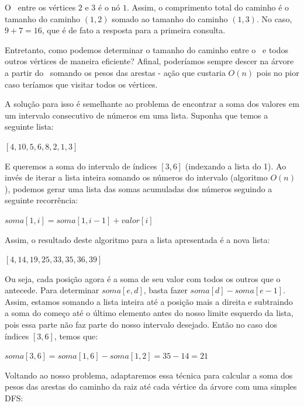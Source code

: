 O \LCA\ entre os vértices $2$ e $3$ é o nó $1$. Assim, o comprimento total do caminho é o tamanho do caminho $(1, 2)$ somado ao tamanho do caminho $(1, 3)$. No caso, $9 + 7 = 16$, que é de fato a resposta para a primeira consulta.

Entretanto, como podemos determinar o tamanho do caminho entre o \LCA\ e todos outros vértices de maneira eficiente? Afinal, poderíamos sempre descer na árvore a partir do \LCA\ somando os pesos das arestas - ação que custaria $O(n)$ pois no pior caso teríamos que visitar todos os vértices.

A solução para isso é semelhante ao problema de encontrar a soma dos valores em um intervalo consecutivo de números em uma lista. Suponha que temos a seguinte lista:

\begin{center}
    $[4, 10, 5, 6, 8, 2, 1, 3]$
\end{center}

E queremos a soma do intervalo de índices $[3, 6]$ (indexando a lista do 1). Ao invés de iterar a lista inteira somando os números do intervalo (algoritmo $O(n)$), podemos gerar uma lista das somas acumuladas dos números seguindo a seguinte recorrência:

\begin{center}
    $soma[1, i] = soma[1, i-1] + valor[i]$
\end{center}

Assim, o resultado deste algoritmo para a lista apresentada é a nova lista:

\begin{center}
    $[4, 14, 19, 25, 33, 35, 36, 39]$
\end{center}

Ou seja, cada posição agora é a soma de seu valor com todos os outros que o antecede. Para determinar $soma[e, d]$, basta fazer $soma[d] - soma[e-1]$. Assim, estamos somando a lista inteira até a posição mais a direita e subtraindo a soma do começo até o último elemento antes do nosso limite esquerdo da lista, pois essa parte não faz parte do nosso intervalo desejado. Então no caso dos índices $[3, 6]$, temos que:

\begin{center}
    $soma[3, 6] = soma[1, 6] - soma[1, 2] = 35 - 14 = 21$\\
\end{center}

Voltando ao nosso problema, adaptaremos essa técnica para calcular a soma dos pesos das arestas do caminho da raiz até cada vértice da árvore com uma simples DFS:

